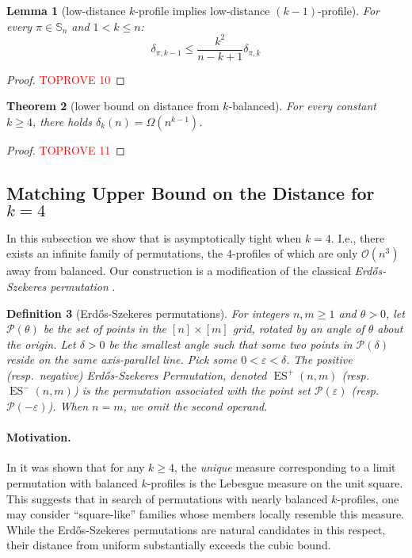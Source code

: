 \documentclass{article}
\newtheorem{theorem}{Theorem}[section]
\newtheorem{lemma}[theorem]{Lemma}
\newtheorem{definition}[theorem]{Definition}
\newcommand{\Sn}{\mathbb{S}_n}
\DeclareMathOperator{\ES}{ES}
\newcommand{\ESZ}{Erd\H{o}s-Szekeres\xspace}
\theoremstyle{remark}
\theoremstyle{plain}
\begin{document}
\begin{lemma}[low-distance $k$-profile implies low-distance $(k-1)$-profile]
    \label{lemma:kclose_implies_lt_k_close}
    For every $\pi \in \Sn$ and $1 < k \le n$:
    \[
        \delta_{\pi,k-1} \leq \frac{k^2}{n-k+1} \delta_{\pi,k}
    \]
\end{lemma}
\begin{proof}\textcolor{red}{TOPROVE 10}\end{proof}

\begin{theorem} [lower bound on distance from $k$-balanced]
    \label{thm:lowerbound_distance}
    For every constant $k\geq 4$, there holds $\delta_k(n) = \Omega(n^{k-1})$.
\end{theorem}
\begin{proof}\textcolor{red}{TOPROVE 11}\end{proof}

\subsection{Matching Upper Bound on the Distance for \texorpdfstring{$k=4$}{k=4}}
\label{subsect:upperbound}
In this subsection we show that  is asymptotically tight when $k=4$. I.e., there exists an infinite family of permutations, the $4$-profiles of which are only $\mathcal{O}(n^{3})$ away from balanced. Our construction is a modification of the classical \emph{\ESZ permutation} \cite{erdos1935combinatorial}.

\begin{definition}[\ESZ permutations]\label{def:esz}
    \label{defn:erdos_szekeres}
    For integers $n,m \ge 1$ and $\theta>0$, let $\mathcal{P}(\theta)$ be the set of points in the $[n] \times [m]$ grid, rotated by an angle of $\theta$ about the origin. Let $\delta>0$ be the smallest angle such that some two points in $\mathcal{P}(\delta)$ reside on the same axis-parallel line. Pick some $0<\varepsilon<\delta$. The positive (resp.\ negative) \ESZ Permutation, denoted $\ES^+(n,m)$ (resp.\ $\ES^-(n,m)$) is the permutation associated with the point set $\mathcal{P}(\varepsilon)$ (resp.\ $\mathcal{P}(-\varepsilon)$). When $n=m$, we omit the second operand.
\end{definition}

\paragraph{Motivation.} In \cite{kral2013quasirandom} it was shown that for any $k\ge 4$, the \emph{unique} measure corresponding to a limit permutation with balanced $k$-profiles is the Lebesgue measure on the unit square. This suggests that in search of permutations with nearly balanced $k$-profiles, one may consider ``square-like'' families whose members locally resemble this measure. While the \ESZ permutations are natural candidates in this respect, their distance from uniform substantially exceeds the cubic bound.
\end{document}
